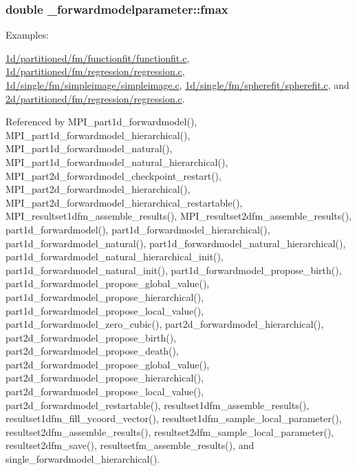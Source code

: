 \subsubsection[{\texorpdfstring{fmax}{fmax}}]{\setlength{\rightskip}{0pt plus 5cm}double \+\_\+forwardmodelparameter\+::fmax}\hypertarget{struct__forwardmodelparameter_aa028b68fc0f738b4d578e90751ffaa24}{}\label{struct__forwardmodelparameter_aa028b68fc0f738b4d578e90751ffaa24}
\begin{Desc}
\item[Examples\+: ]\par
\hyperlink{1d_2partitioned_2fm_2functionfit_2functionfit_8c-example}{1d/partitioned/fm/functionfit/functionfit.\+c}, \hyperlink{1d_2partitioned_2fm_2regression_2regression_8c-example}{1d/partitioned/fm/regression/regression.\+c}, \hyperlink{1d_2single_2fm_2simpleimage_2simpleimage_8c-example}{1d/single/fm/simpleimage/simpleimage.\+c}, \hyperlink{1d_2single_2fm_2spherefit_2spherefit_8c-example}{1d/single/fm/spherefit/spherefit.\+c}, and \hyperlink{2d_2partitioned_2fm_2regression_2regression_8c-example}{2d/partitioned/fm/regression/regression.\+c}.\end{Desc}


Referenced by M\+P\+I\+\_\+part1d\+\_\+forwardmodel(), M\+P\+I\+\_\+part1d\+\_\+forwardmodel\+\_\+hierarchical(), M\+P\+I\+\_\+part1d\+\_\+forwardmodel\+\_\+natural(), M\+P\+I\+\_\+part1d\+\_\+forwardmodel\+\_\+natural\+\_\+hierarchical(), M\+P\+I\+\_\+part2d\+\_\+forwardmodel\+\_\+checkpoint\+\_\+restart(), M\+P\+I\+\_\+part2d\+\_\+forwardmodel\+\_\+hierarchical(), M\+P\+I\+\_\+part2d\+\_\+forwardmodel\+\_\+hierarchical\+\_\+restartable(), M\+P\+I\+\_\+resultset1dfm\+\_\+assemble\+\_\+results(), M\+P\+I\+\_\+resultset2dfm\+\_\+assemble\+\_\+results(), part1d\+\_\+forwardmodel(), part1d\+\_\+forwardmodel\+\_\+hierarchical(), part1d\+\_\+forwardmodel\+\_\+natural(), part1d\+\_\+forwardmodel\+\_\+natural\+\_\+hierarchical(), part1d\+\_\+forwardmodel\+\_\+natural\+\_\+hierarchical\+\_\+init(), part1d\+\_\+forwardmodel\+\_\+natural\+\_\+init(), part1d\+\_\+forwardmodel\+\_\+propose\+\_\+birth(), part1d\+\_\+forwardmodel\+\_\+propose\+\_\+global\+\_\+value(), part1d\+\_\+forwardmodel\+\_\+propose\+\_\+hierarchical(), part1d\+\_\+forwardmodel\+\_\+propose\+\_\+local\+\_\+value(), part1d\+\_\+forwardmodel\+\_\+zero\+\_\+cubic(), part2d\+\_\+forwardmodel\+\_\+hierarchical(), part2d\+\_\+forwardmodel\+\_\+propose\+\_\+birth(), part2d\+\_\+forwardmodel\+\_\+propose\+\_\+death(), part2d\+\_\+forwardmodel\+\_\+propose\+\_\+global\+\_\+value(), part2d\+\_\+forwardmodel\+\_\+propose\+\_\+hierarchical(), part2d\+\_\+forwardmodel\+\_\+propose\+\_\+local\+\_\+value(), part2d\+\_\+forwardmodel\+\_\+restartable(), resultset1dfm\+\_\+assemble\+\_\+results(), resultset1dfm\+\_\+fill\+\_\+ycoord\+\_\+vector(), resultset1dfm\+\_\+sample\+\_\+local\+\_\+parameter(), resultset2dfm\+\_\+assemble\+\_\+results(), resultset2dfm\+\_\+sample\+\_\+local\+\_\+parameter(), resultset2dfm\+\_\+save(), resultsetfm\+\_\+assemble\+\_\+results(), and single\+\_\+forwardmodel\+\_\+hierarchical().

